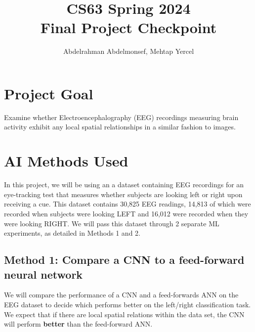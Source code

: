 \documentclass[11pt]{article}
\title{CS63 Spring 2024\\Final Project Checkpoint}
\author{Abdelrahman Abdelmonsef, Mehtap Yercel}
\date{}
\begin{document}
\maketitle

\section{Project Goal}


Examine whether Electroencephalography (EEG) recordings measuring brain activity exhibit any local spatial relationships in a similar fashion to images.

\section{AI Methods Used}

In this project, we will be using an a dataset containing EEG recordings for an eye-tracking test that measures whether subjects are looking left or right upon receiving a cue. This dataset contains 30,825 EEG readings, 14,813 of which were recorded when subjects were looking LEFT and 16,012 were recorded when they were looking RIGHT. We will pass this dataset through 2 separate ML experiments, as detailed in Methods 1 and 2. 

\vspace{2mm}

\subsection{Method 1: Compare a CNN to a feed-forward neural network}

\vspace{1mm}


We will compare the performance of a CNN and a feed-forwards ANN on the EEG dataset to decide which
performs better on the left/right classification task. We expect that if there are local spatial relations within the data set, 
the CNN will perform \textbf{better} than the feed-forward ANN.


    
    
\end{document}
